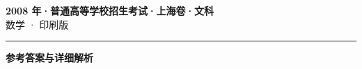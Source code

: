 \documentclass[zihao=5, a4paper]{ctexart}
\begin{document}
\begin{center}
  {\Large\bfseries 2008 年·普通高等学校招生考试·上海卷·文科}\\[4pt]
  {\large 数学 · 印刷版}
\end{center}
\medskip
{}

\par\bigskip\hrule\bigskip
{}
\begin{center}{\large\bfseries 参考答案与详细解析}\end{center}
\smallskip

\end{document}
